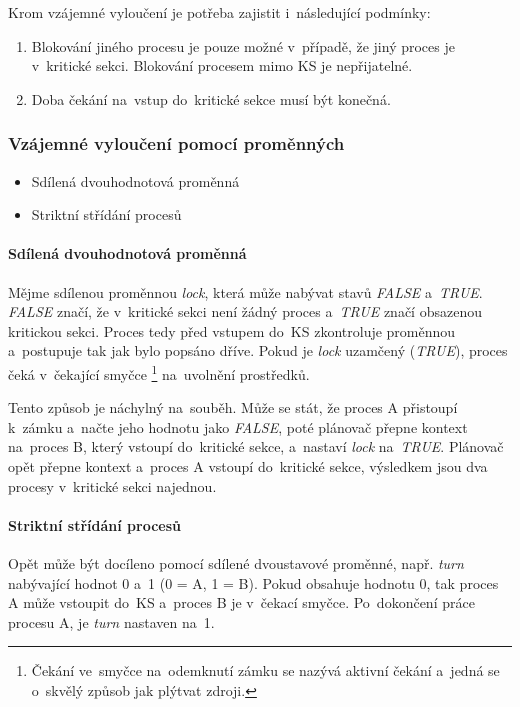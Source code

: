 Krom vzájemné vyloučení je potřeba zajistit i~následující podmínky:

\begin{enumerate}
	\item Blokování jiného procesu je pouze možné v~případě, že jiný proces je v~kritické sekci. Blokování procesem mimo KS je nepřijatelné.
	\item Doba čekání na~vstup do~kritické sekce musí být konečná.
\end{enumerate}

\subsubsection{Vzájemné vyloučení pomocí proměnných}

\begin{itemize}
	\item Sdílená dvouhodnotová proměnná
	\item Striktní střídání procesů
\end{itemize}

\paragraph{Sdílená dvouhodnotová proměnná}

Mějme sdílenou proměnnou \emph{lock}, která může nabývat stavů \emph{FALSE} a~\emph{TRUE}. \emph{FALSE} značí, že v~kritické sekci není žádný proces a~\emph{TRUE} značí obsazenou kritickou sekci. Proces tedy před vstupem do~KS zkontroluje proměnnou a~postupuje tak jak bylo popsáno dříve. Pokud je \emph{lock} uzamčený (\emph{TRUE}), proces čeká v~čekající smyčce%
\footnote{Čekání ve~smyčce na~odemknutí zámku se nazývá aktivní čekání a~jedná se o~skvělý způsob jak plýtvat zdroji.}
na~uvolnění prostředků.

Tento způsob je náchylný na~souběh. Může se stát, že proces A přistoupí k~zámku a~načte jeho hodnotu jako \emph{FALSE}, poté plánovač přepne kontext na~proces B, který vstoupí do~kritické sekce, a~nastaví \emph{lock} na~\emph{TRUE}. Plánovač opět přepne kontext a~proces A vstoupí do~kritické sekce, výsledkem jsou dva procesy v~kritické sekci najednou.

\paragraph{Striktní střídání procesů}

Opět může být docíleno pomocí sdílené dvoustavové proměnné, např. \emph{turn} nabývající hodnot 0 a~1 (0 = A, 1 = B). Pokud obsahuje hodnotu 0, tak proces A může vstoupit do~KS a~proces B je v~čekací smyčce. Po~dokončení práce procesu A, je \emph{turn} nastaven na~1.

